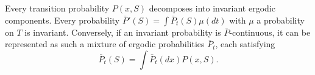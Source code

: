 Every transition probability $P(x,S)$ decomposes into invariant ergodic components. Every probability $\bar{P}'(S)=\int\bar{P}_t(S)\mu(dt)$ with $\mu$ a probability on $T$ is invariant. Conversely, if an invariant probability is $\bar{P}$-continuous, it can be represented as such a mixture of ergodic probabilities $\bar{P}_t$, each satisfying
$$\bar{P}_t(S)=\int\bar{P}_t(dx)P(x,S).$$
